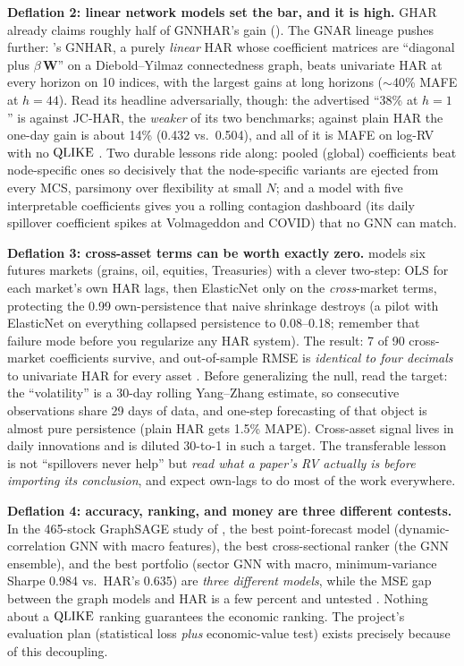 \textbf{Deflation 2: linear network models set the bar, and it is high.} GHAR already claims roughly half of GNNHAR's gain (). The GNAR lineage pushes further: \citet{BoettiNunes2026}'s GNHAR, a purely \emph{linear} HAR whose coefficient matrices are ``diagonal plus $\beta\,\mathbf{W}$'' on a Diebold--Yilmaz connectedness graph, beats univariate HAR at every horizon on 10 indices, with the largest gains at long horizons ($\sim$40\% MAFE at $h=44$). Read its headline adversarially, though: the advertised ``38\% at $h=1$'' is against JC-HAR, the \emph{weaker} of its two benchmarks; against plain HAR the one-day gain is about 14\% (0.432 vs.\ 0.504), and all of it is MAFE on log-RV with no $\operatorname{QLIKE}$ \citep[Table~2, p.~14]{BoettiNunes2026}. Two durable lessons ride along: pooled (global) coefficients beat node-specific ones so decisively that the node-specific variants are ejected from every MCS, parsimony over flexibility at small $N$; and a model with five interpretable coefficients gives you a rolling contagion dashboard (its daily spillover coefficient spikes at Volmageddon and COVID) that no GNN can match.

\textbf{Deflation 3: cross-asset terms can be worth exactly zero.} \citet{Mallory2026} models six futures markets (grains, oil, equities, Treasuries) with a clever two-step: OLS for each market's own HAR lags, then ElasticNet only on the \emph{cross}-market terms, protecting the 0.99 own-persistence that naive shrinkage destroys (a pilot with ElasticNet on everything collapsed persistence to 0.08--0.18; remember that failure mode before you regularize any HAR system). The result: 7 of 90 cross-market coefficients survive, and out-of-sample RMSE is \emph{identical to four decimals} to univariate HAR for every asset \citep[Table~3, p.~17; Fig.~3, p.~20]{Mallory2026}. Before generalizing the null, read the target: the ``volatility'' is a 30-day rolling Yang--Zhang estimate, so consecutive observations share 29 days of data, and one-step forecasting of that object is almost pure persistence (plain HAR gets 1.5\% MAPE). Cross-asset signal lives in daily innovations and is diluted 30-to-1 in such a target. The transferable lesson is not ``spillovers never help'' but \emph{read what a paper's RV actually is before importing its conclusion}, and expect own-lags to do most of the work everywhere.

\textbf{Deflation 4: accuracy, ranking, and money are three different contests.} In the 465-stock GraphSAGE study of \citet{Wade2026GNNPortfolios}, the best point-forecast model (dynamic-correlation GNN with macro features), the best cross-sectional ranker (the GNN ensemble), and the best portfolio (sector GNN with macro, minimum-variance Sharpe 0.984 vs.\ HAR's 0.635) are \emph{three different models}, while the MSE gap between the graph models and HAR is a few percent and untested \citep[Tables~3--5, \S5.5]{Wade2026GNNPortfolios}. Nothing about a $\operatorname{QLIKE}$ ranking guarantees the economic ranking. The project's evaluation plan (statistical loss \emph{plus} economic-value test) exists precisely because of this decoupling.

